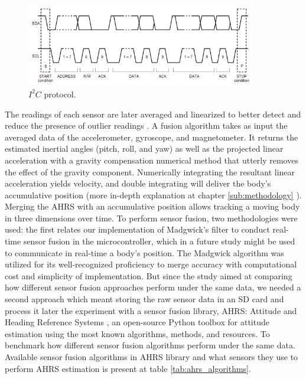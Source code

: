 \begin{figure}[!h]
    \centering
    \includegraphics[width=0.9\textwidth]{figures/i2c.png}
    \caption{ $I^2C$ protocol. }
    \label{fig:i2c}
\end{figure}

The readings of each sensor are later averaged and linearized to better detect and reduce the presence of outlier readings \cite{khamphroo2017micropython}. A fusion algorithm takes as input the averaged data of the accelerometer, gyroscope, and magnetometer. It returns the estimated inertial angles (pitch, roll, and yaw) as well as the projected linear acceleration with a gravity compensation numerical method that utterly removes the effect of the gravity component. Numerically integrating the resultant linear acceleration yields velocity, and double integrating will deliver the body's accumulative position (more in-depth explanation at chapter \ref{sub:methodology} ). Merging the AHRS with an accumulative position allows tracking a moving body in three dimensions over time. To perform sensor fusion, two methodologies were used: the first relates our implementation of Madgwick's filter to conduct real-time sensor fusion in the microcontroller, which in a future study might be used to communicate in real-time a body's position. The Madgwick algorithm was utilized for its well-recognized proficiency to merge accuracy with computational cost and simplicity of implementation. But since the study aimed at comparing how different sensor fusion approaches perform under the same data, we needed a second approach which meant storing the raw sensor data in an SD card and process it later the experiment with a sensor fusion library, AHRS: Attitude and Heading Reference Systems \cite{ahrs}, an open-source Python toolbox for attitude estimation using the most known algorithms, methods, and resources. To benchmark how different sensor fusion algorithms perform under the same data. Available sensor fusion algorithms in AHRS library and what sensors they use to perform AHRS estimation is present at table \ref{tab:ahrs_algorithms}.


